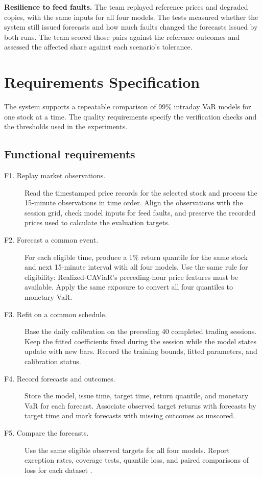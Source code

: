 \documentclass[
	12pt,				%
	openright,			%
	twoside,			%
	a4paper,
	chapter=TITLE,
	english				%
	]{abntex2}
\begin{document}
\textbf{Resilience to feed faults.} The team replayed reference prices and degraded copies, with the same inputs for all four models. The tests measured whether the system still issued forecasts and how much faults changed the forecasts issued by both runs. The team scored those pairs against the reference outcomes and assessed the affected share against each scenario's tolerance.

\chapter{Requirements Specification} \label{cap:requisitos}

The system supports a repeatable comparison of 99\% intraday VaR models for one stock at a time. The quality requirements specify the verification checks and the thresholds used in the experiments.

\section{Functional requirements}

\begin{description}
  \item[F1. Replay market observations.] Read the timestamped price records for the selected stock and process the 15-minute observations in time order. Align the observations with the session grid, check model inputs for feed faults, and preserve the recorded prices used to calculate the evaluation targets.
  \item[F2. Forecast a common event.] For each eligible time, produce a 1\% return quantile for the same stock and next 15-minute interval with all four models. Use the same rule for eligibility: Realized-CAViaR's preceding-hour price features must be available. Apply the same exposure to convert all four quantiles to monetary VaR.
  \item[F3. Refit on a common schedule.] Base the daily calibration on the preceding 40 completed trading sessions. Keep the fitted coefficients fixed during the session while the model states update with new bars. Record the training bounds, fitted parameters, and calibration status.
  \item[F4. Record forecasts and outcomes.] Store the model, issue time, target time, return quantile, and monetary VaR for each forecast. Associate observed target returns with forecasts by target time and mark forecasts with missing outcomes as unscored.
  \item[F5. Compare the forecasts.] Use the same eligible observed targets for all four models. Report exception rates, coverage tests, quantile loss, and paired comparisons of loss for each dataset \cite{project-comparison}.
\end{description}
\end{document}
